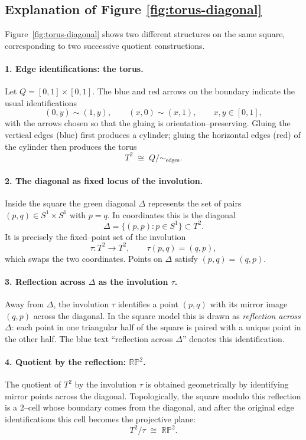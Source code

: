 \documentclass[12pt,a4paper]{article}
\theoremstyle{plain}
\theoremstyle{definition}      %
\begin{document}
	
	\subsection*{Explanation of Figure \ref{fig:torus-diagonal}}
	
	Figure~\ref{fig:torus-diagonal} shows two different structures on the same
	square, corresponding to two successive quotient constructions.
	
	\paragraph{1. Edge identifications: the torus.}
	Let $Q=[0,1]\times[0,1]$.  The blue and red arrows on the boundary indicate the
	usual identifications
	\[
	(0,y)\sim(1,y), \qquad (x,0)\sim(x,1), \qquad x,y\in[0,1],
	\]
	with the arrows chosen so that the gluing is orientation–preserving.  Gluing
	the vertical edges (blue) first produces a cylinder; gluing the horizontal
	edges (red) of the cylinder then produces the torus
	\[
	T^{2} \;\cong\; Q/\!\sim_{\text{edges}}.
	\]
	
	\paragraph{2. The diagonal as fixed locus of the involution.}
	Inside the square the green diagonal $\Delta$ represents the set of pairs
	$(p,q)\in S^{1}\times S^{1}$ with $p=q$.  In coordinates this is the diagonal
	\[
	\Delta=\{(p,p):p\in S^{1}\}\subset T^{2}.
	\]
	It is precisely the fixed–point set of the involution
	\[
	\tau:T^{2}\to T^{2}, \qquad \tau(p,q)=(q,p),
	\]
	which swaps the two coordinates.  Points on $\Delta$ satisfy $(p,q)=(q,p)$.
	
	\paragraph{3. Reflection across $\Delta$ as the involution $\tau$.}
	Away from $\Delta$, the involution $\tau$ identifies a point $(p,q)$ with its
	mirror image $(q,p)$ across the diagonal.  In the square model this is drawn
	as \emph{reflection across $\Delta$}: each point in one triangular half of the
	square is paired with a unique point in the other half.  The blue text
	“reflection across $\Delta$” denotes this identification.
	
	\paragraph{4. Quotient by the reflection: $\mathbb{RP}^{2}$.}
	The quotient of $T^{2}$ by the involution $\tau$ is obtained geometrically by
	identifying mirror points across the diagonal.  Topologically, the square
	modulo this reflection is a $2$–cell whose boundary comes from the diagonal,
	and after the original edge identifications this cell becomes the projective
	plane:
	\[
	T^{2}/\tau \;\cong\; \mathbb{RP}^{2}.
	\]
	
\end{document}
